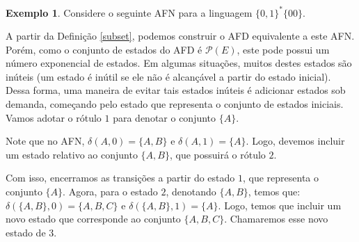 \documentclass[a4paper]{article}
\theoremstyle{definition}
\newtheorem{Example}{Exemplo}
\begin{document}
  \begin{Example}
    Considere o seguinte AFN para a linguagem
    $\{0,1\}^*\{00\}$.
    \begin{figure}[H]
      \centering
    \end{figure}
    A partir da Definição \ref{subset}, podemos construir o AFD equivalente a
    este AFN. Porém, como o conjunto de estados do AFD é $\mathcal{P}(E)$, este
    pode possui um número exponencial de estados. Em algumas situações, muitos
    destes estados são inúteis (um estado é inútil se ele não é alcançável a
    partir do estado inicial). Dessa forma, uma maneira de evitar tais estados
    inúteis é adicionar estados sob demanda, começando pelo estado que
    representa o conjunto de estados iniciais. Vamos adotar o rótulo $1$ para
    denotar o conjunto $\{A\}$.
    \begin{figure}[H]
      \centering
    \end{figure}
     Note que no AFN, $\delta(A,0) =\{A,B\}$ e $\delta(A,1)
     = \{A\}$. Logo, devemos incluir um estado relativo ao conjunto $\{A,B\}$,
     que possuirá o rótulo $2$.
    \begin{figure}[H]
      \centering
    \end{figure}
    Com isso, encerramos as transições a partir do estado $1$, que representa o
    conjunto $\{A\}$. Agora, para o estado $2$, denotando $\{A,B\}$, temos que:
    $\delta(\{A,B\},0) = \{A,B,C\}$ e $\delta(\{A,B\},1) = \{A\}$. Logo, temos
    que incluir um novo estado que corresponde ao conjunto $\{A,B,C\}$.
    Chamaremos esse novo estado de $3$.
    \begin{figure}[H]

\end{figure}
\end{Example}
\end{document}
